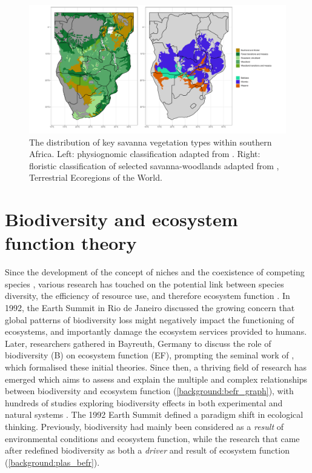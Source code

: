 \begin{refsection}
\begin{figure}[tb]
	\includegraphics[width=\textwidth]{img/saf_map_both}
	\caption[Map of savanna vegetation types in Southern Africa]{The distribution of key savanna vegetation types within southern Africa. Left: physiognomic classification adapted from \citet{White1983}. Right: floristic classification of selected savanna-woodlands adapted from \citet{Dinerstein2017}, Terrestrial Ecoregions of the World.}
	\label{background:saf_map}
\end{figure}

\section{Biodiversity and ecosystem function theory}
\label{background:sec:befr_theory}

Since the development of the concept of niches \citep{Grinnell1904, MacArthur1967} and the coexistence of competing species \citep{Elton1927}, various research has touched on the potential link between species diversity, the efficiency of resource use, and therefore ecosystem function \citep{Hairston1960, Janzen1970, Grime1973, Whittaker1960}. In 1992, the Earth Summit in Rio de Janeiro discussed the growing concern that global patterns of biodiversity loss might negatively impact the functioning of ecosystems, and importantly damage the ecosystem services provided to humans. Later, researchers gathered in Bayreuth, Germany to discuss the role of biodiversity (B) on ecosystem function (EF), prompting the seminal work of \citet{Schulze1993}, which formalised these initial theories. Since then, a thriving field of research has emerged which aims to assess and explain the multiple and complex relationships between biodiversity and ecosystem function (\autoref{background:befr_graph}), with hundreds of studies exploring biodiversity effects in both experimental and natural systems \citep{Plas2019, Newbold2016, Tilman2014}. The 1992 Earth Summit defined a paradigm shift in ecological thinking. Previously, biodiversity had mainly been considered as a \textit{result} of environmental conditions and ecosystem function, while the research that came after redefined biodiversity as both a \textit{driver} and result of ecosystem function (\autoref{background:plas_befr}).


\end{refsection}

